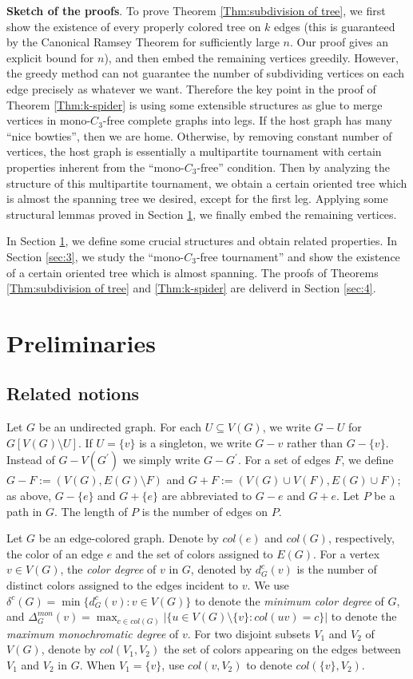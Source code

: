 \documentclass[11pt,a4paper]{article}
\theoremstyle{definition}
\begin{document}
\noindent \textbf{Sketch of the proofs}. To prove Theorem \ref{Thm:subdivision of tree}, we first show the existence of every properly colored tree on $k$ edges (this is guaranteed by the Canonical Ramsey Theorem for sufficiently large $n$. Our proof gives an explicit bound for $n$), and then embed the remaining vertices greedily. However, the greedy method can not guarantee the number of subdividing vertices on each edge precisely as whatever we want. Therefore the key point in the proof of Theorem \ref{Thm:k-spider} is using some extensible structures as glue to merge vertices in mono-$C_3$-free complete graphs into legs. If the host graph has many ``nice bowties'', then we are home. Otherwise, by removing constant number of vertices, the host graph is essentially a multipartite tournament with certain properties inherent from the ``mono-$C_3$-free'' condition. Then by analyzing the structure of this multipartite tournament, we obtain a certain oriented tree which is almost the spanning tree we desired, except for the first leg. Applying some structural lemmas proved in  Section \ref{sec:2}, we finally embed the remaining vertices.

In Section \ref{sec:2}, we define some crucial structures and obtain related properties. In Section \ref{sec:3}, we study the ``mono-$C_3$-free tournament'' and show the existence of a certain oriented tree which is almost spanning. The proofs of Theorems \ref{Thm:subdivision of tree} and \ref{Thm:k-spider} are deliverd in Section \ref{sec:4}.
\section{Preliminaries}\label{sec:2}
\subsection{Related notions}

Let $G$ be an undirected graph. For each $U\subseteq V(G)$, we write $G-U$ for
$G[V(G) \setminus U]$.  If  $U=\{v\}$ is a singleton,
we write $G- v$ rather than $G-\{v\}$. Instead of $G-V (G^{\prime}  )$ we simply
write $G-G^{\prime}$.  For a set of edges $F$, we define $G-F:= (V(G), E(G)\setminus F)$ and $G+F:= (V(G)\cup V(F), E(G) \cup F)$;
as above, $G-\{e\}$ and $G+\{e\}$ are abbreviated to
$ G-e$ and $G+e$. Let $P$ be a path in $G$. The length of $P$ is the number of edges on $P$.


Let $G$ be an edge-colored graph. Denote by $col(e)$ and $col(G)$, respectively, the color of an edge $e$ and the set of colors assigned to $E(G)$.
For a vertex $v\in V(G)$, the \textit{color degree} of $v$ in $G$, denoted by $d^{c}_{G}(v)$ is the number of distinct colors assigned to the edges incident to $v$.
We use $\delta^{c}(G)=\min\{d^{c}_{G}(v): v\in V(G)\}$ to denote the \emph{minimum color degree} of $G$, and $\Delta^{mon}_G(v) = \max_{c\in col(G)}|\{u\in V(G)\setminus\{v\}: col(uv) = c\}|$ to denote the \emph{maximum monochromatic degree} of $v$.
For two disjoint subsets $V_1$ and $V_2$ of $V(G)$, denote by $col(V_1, V_2)$ the set of colors appearing on the edges between $V_1$ and $V_2$ in $G$. When $V_1=\{v\}$, use $col(v, V_2)$ to denote $col(\{v\}, V_2)$.
\end{document}

